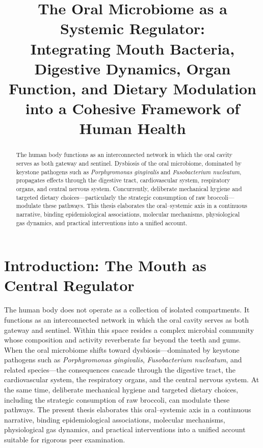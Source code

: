 \documentclass[11pt,a4paper]{article}
\title{The Oral Microbiome as a Systemic Regulator:\\[0.3em]
\large Integrating Mouth Bacteria, Digestive Dynamics, Organ Function, and Dietary Modulation into a Cohesive Framework of Human Health}
\author{}
\date{}
\begin{document}
\maketitle

\begin{abstract}
\noindent
The human body functions as an interconnected network in which the oral cavity serves as both gateway and sentinel. Dysbiosis of the oral microbiome, dominated by keystone pathogens such as \textit{Porphyromonas gingivalis} and \textit{Fusobacterium nucleatum}, propagates effects through the digestive tract, cardiovascular system, respiratory organs, and central nervous system. Concurrently, deliberate mechanical hygiene and targeted dietary choices---particularly the strategic consumption of raw broccoli---modulate these pathways. This thesis elaborates the oral--systemic axis in a continuous narrative, binding epidemiological associations, molecular mechanisms, physiological gas dynamics, and practical interventions into a unified account.
\end{abstract}

\section{Introduction: The Mouth as Central Regulator}
The human body does not operate as a collection of isolated compartments. It functions as an interconnected network in which the oral cavity serves as both gateway and sentinel. Within this space resides a complex microbial community whose composition and activity reverberate far beyond the teeth and gums. When the oral microbiome shifts toward dysbiosis---dominated by keystone pathogens such as \textit{Porphyromonas gingivalis}, \textit{Fusobacterium nucleatum}, and related species---the consequences cascade through the digestive tract, the cardiovascular system, the respiratory organs, and the central nervous system. At the same time, deliberate mechanical hygiene and targeted dietary choices, including the strategic consumption of raw broccoli, can modulate these pathways. The present thesis elaborates this oral--systemic axis in a continuous narrative, binding epidemiological associations, molecular mechanisms, physiological gas dynamics, and practical interventions into a unified account suitable for rigorous peer examination.
\end{document}
